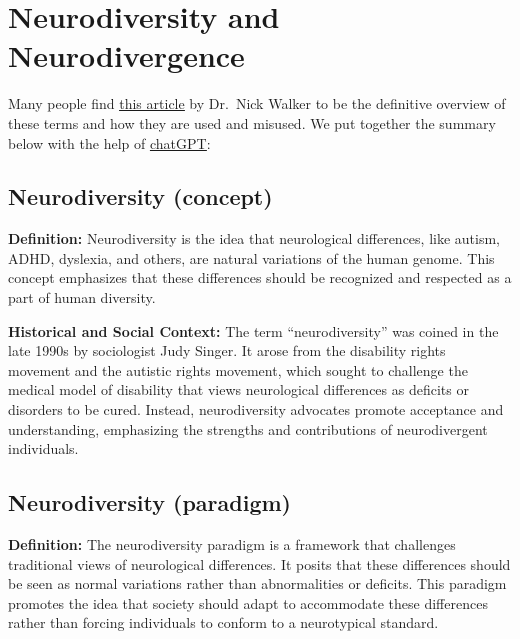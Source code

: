 \documentclass[
  letterpaper,
  DIV=11,
  numbers=noendperiod]{scrreprt}
\begin{document}
\hypertarget{section-8}{%
\chapter{}\label{section-8}}

\hypertarget{appendix-neurodiversity}{%
\chapter{Neurodiversity and
Neurodivergence}\label{appendix-neurodiversity}}

Many people find
\href{https://neuroqueer.com/neurodiversity-terms-and-definitions/}{\uline{this
article}} by Dr.~Nick Walker to be the definitive overview of these
terms and how they are used and misused. We put together the summary
below with the help of
\href{https://chatgpt.com/share/e60ffdec-5945-45d2-9a14-2abe39cf4f8d}{\uline{chatGPT}}:

\hypertarget{neurodiversity-concept}{%
\section{Neurodiversity (concept)}\label{neurodiversity-concept}}

\textbf{Definition:} Neurodiversity is the idea that neurological
differences, like autism, ADHD, dyslexia, and others, are natural
variations of the human genome. This concept emphasizes that these
differences should be recognized and respected as a part of human
diversity.

\textbf{Historical and Social Context:} The term ``neurodiversity'' was
coined in the late 1990s by sociologist Judy Singer. It arose from the
disability rights movement and the autistic rights movement, which
sought to challenge the medical model of disability that views
neurological differences as deficits or disorders to be cured. Instead,
neurodiversity advocates promote acceptance and understanding,
emphasizing the strengths and contributions of neurodivergent
individuals.

\hypertarget{neurodiversity-paradigm}{%
\section{Neurodiversity (paradigm)}\label{neurodiversity-paradigm}}

\textbf{Definition:} The neurodiversity paradigm is a framework that
challenges traditional views of neurological differences. It posits that
these differences should be seen as normal variations rather than
abnormalities or deficits. This paradigm promotes the idea that society
should adapt to accommodate these differences rather than forcing
individuals to conform to a neurotypical standard.
\end{document}
